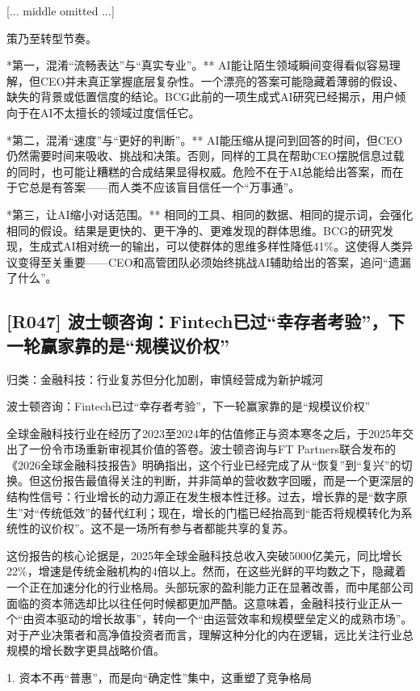 \documentclass[11pt]{ctexart}
\begin{document}
[... middle omitted ...]

策乃至转型节奏。

*第一，混淆“流畅表达”与“真实专业”。** AI能让陌生领域瞬间变得看似容易理解，但CEO并未真正掌握底层复杂性。一个漂亮的答案可能隐藏着薄弱的假设、缺失的背景或低置信度的结论。BCG此前的一项生成式AI研究已经揭示，用户倾向于在AI不太擅长的领域过度信任它。

*第二，混淆“速度”与“更好的判断”。** AI能压缩从提问到回答的时间，但CEO仍然需要时间来吸收、挑战和决策。否则，同样的工具在帮助CEO摆脱信息过载的同时，也可能让糟糕的合成结果显得权威。危险不在于AI总能给出答案，而在于它总是有答案——而人类不应该盲目信任一个“万事通”。

*第三，让AI缩小对话范围。** 相同的工具、相同的数据、相同的提示词，会强化相同的假设。结果是更快的、更干净的、更难发现的群体思维。BCG的研究发现，生成式AI相对统一的输出，可以使群体的思维多样性降低41\%。这使得人类异议变得至关重要——CEO和高管团队必须始终挑战AI辅助给出的答案，追问“遗漏了什么”。

\subsection{[R047] 波士顿咨询：Fintech已过“幸存者考验”，下一轮赢家靠的是“规模议价权”}
{\small\color{refgray}归类：金融科技：行业复苏但分化加剧，审慎经营成为新护城河}

波士顿咨询：Fintech已过“幸存者考验”，下一轮赢家靠的是“规模议价权”

全球金融科技行业在经历了2023至2024年的估值修正与资本寒冬之后，于2025年交出了一份令市场重新审视其价值的答卷。波士顿咨询与FT Partners联合发布的《2026全球金融科技报告》明确指出，这个行业已经完成了从“恢复”到“复兴”的切换。但这份报告最值得关注的判断，并非简单的营收数字回暖，而是一个更深层的结构性信号：行业增长的动力源正在发生根本性迁移。过去，增长靠的是“数字原生”对“传统低效”的替代红利；现在，增长的门槛已经抬高到“能否将规模转化为系统性的议价权”。这不是一场所有参与者都能共享的复苏。

这份报告的核心论据是，2025年全球金融科技总收入突破5000亿美元，同比增长22\%，增速是传统金融机构的4倍以上。然而，在这些光鲜的平均数之下，隐藏着一个正在加速分化的行业格局。头部玩家的盈利能力正在显著改善，而中尾部公司面临的资本筛选却比以往任何时候都更加严酷。这意味着，金融科技行业正从一个“由资本驱动的增长故事”，转向一个“由运营效率和规模壁垒定义的成熟市场”。对于产业决策者和高净值投资者而言，理解这种分化的内在逻辑，远比关注行业总规模的增长数字更具战略价值。

1. 资本不再“普惠”，而是向“确定性”集中，这重塑了竞争格局
\end{document}
